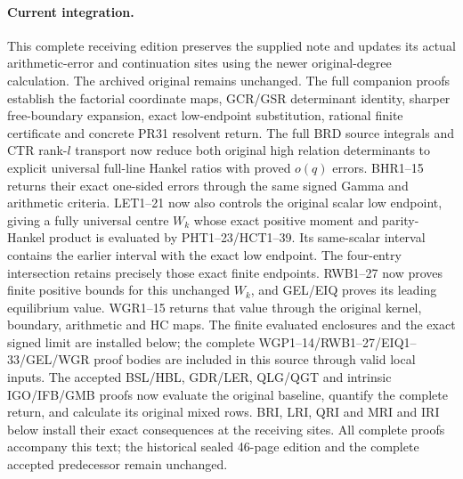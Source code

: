 \documentclass[11pt,a4paper]{article}
\begin{document}
\paragraph{Current integration.}
This complete receiving edition preserves the supplied note and updates
its actual arithmetic-error and continuation sites using the newer
original-degree calculation. The archived original remains unchanged.
The full companion proofs establish the factorial coordinate maps,
GCR/GSR determinant identity, sharper free-boundary expansion,
exact low-endpoint substitution, rational finite certificate and
concrete PR31 resolvent return. The full BRD source integrals
and CTR rank-$l$ transport now reduce both original high relation
determinants to explicit universal full-line Hankel ratios with
proved $o(q)$ errors. BHR1--15 returns their exact one-sided
errors through the same signed Gamma and arithmetic criteria.
LET1--21 now also controls the original scalar low endpoint,
giving a fully universal centre $W_k$ whose exact positive
moment and parity-Hankel product is evaluated by PHT1--23/HCT1--39.
Its same-scalar interval contains the earlier interval with
the exact low endpoint. The four-entry intersection retains precisely
those exact finite endpoints. RWB1--27 now proves finite positive
bounds for this unchanged $W_k$, and GEL/EIQ proves its leading
equilibrium value. WGR1--15 returns that value through the original
kernel, boundary, arithmetic and HC maps. The finite evaluated
enclosures and the exact signed limit are installed below; the
complete WGP1--14/RWB1--27/EIQ1--33/GEL/WGR proof bodies are
included in this source through valid local inputs.
The accepted BSL/HBL, GDR/LER, QLG/QGT and intrinsic IGO/IFB/GMB
proofs now evaluate the original baseline, quantify the complete
return, and calculate its original mixed rows. BRI, LRI, QRI and
MRI and IRI below install their exact consequences at the receiving sites.
All complete proofs accompany this text; the historical sealed
46-page edition and the complete accepted predecessor remain unchanged.
\tableofcontents
\end{document}
